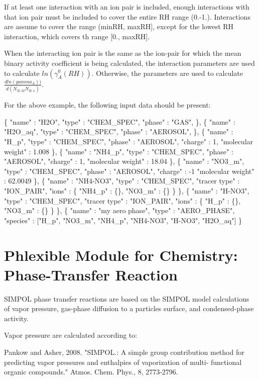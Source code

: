 If at least one interaction with an ion pair is included, enough interactions with that ion pair must be included to cover the entire RH range (0.-\/1.). Interactions are assume to cover the range (min\+RH, max\+RH\mbox{]}, except for the lowest RH interaction, which covers th range \mbox{[}0., max\+RH\mbox{]}.

When the interacting ion pair is the same as the ion-\/pair for which the mean binary activity coefficient is being calculated, the interaction parameters are used to calculate $ln(\gamma_A^0(RH))$. Otherwise, the parameters are used to calculate $\frac{dln(gamma_A))}{d(N_{B,M}N_{B,x})}$.

For the above example, the following input data should be present\+: 
\begin{DoxyCode}
\{
  "name" : "H2O",
  "type" : "CHEM\_SPEC",
  "phase" : "GAS",
\},  
\{
  "name" : "H2O\_aq",
  "type" : "CHEM\_SPEC",
  "phase" : "AEROSOL",
\},  
\{
  "name" : "H\_p",
  "type" : "CHEM\_SPEC",
  "phase" : "AEROSOL",
  "charge" : 1,
  "molecular weight" : 1.008
\},
\{
  "name" : "NH4\_p",
  "type" : "CHEM\_SPEC",
  "phase" : "AEROSOL",
  "charge" : 1,
  "molecular weight" : 18.04
\},
\{
  "name" : "NO3\_m",
  "type" : "CHEM\_SPEC",
  "phase" : "AEROSOL",
  "charge" : -1
  "molecular weight" : 62.0049
\},
\{
  "name" : "NH4-NO3",
  "type" : "CHEM\_SPEC",
  "tracer type" : "ION\_PAIR",
  "ions" : \{
    "NH4\_p" : \{\},
    "NO3\_m" : \{\}
  \}
\},
\{
  "name" : "H-NO3",
  "type" : "CHEM\_SPEC",
  "tracer type" : "ION\_PAIR",
  "ions" : \{
    "H\_p" : \{\},
    "NO3\_m" : \{\}
  \}
\},
\{
  "name" : "my aero phase",
  "type" : "AERO\_PHASE",
  "species" : ["H\_p", "NO3\_m", "NH4\_p", "NH4-NO3", "H-NO3", "H2O\_aq"]
\}
\end{DoxyCode}
\hypertarget{phlex_rxn_SIMPOL_phase_transfer}{}\section{Phlexible Module for Chemistry\+: Phase-\/\+Transfer Reaction}\label{phlex_rxn_SIMPOL_phase_transfer}
S\+I\+M\+P\+OL phase transfer reactions are based on the S\+I\+M\+P\+OL model calculations of vapor pressure, gas-\/phase diffusion to a particle\textquotesingle{}s surface, and condensed-\/phase activity.

Vapor pressure are calculated according to\+:

Pankow and Asher, 2008. "S\+I\+M\+P\+O\+L.\+: A simple group contribution method for predicting vapor pressures and enthalpies of vaporization of multi-\/ functional organic compounds." Atmos. Chem. Phys., 8, 2773-\/2796.

